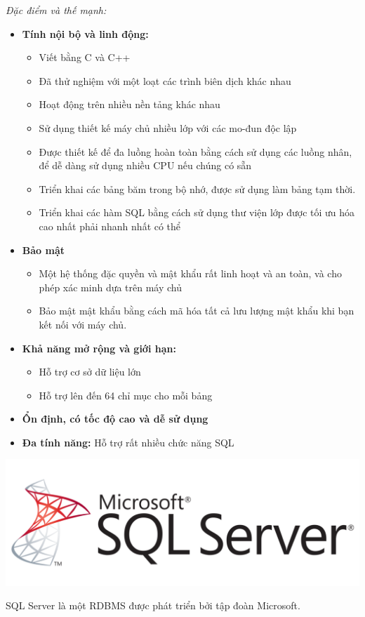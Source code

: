 \textit{Đặc điểm và thế mạnh:}
\begin{itemize}
    \item \textbf{Tính nội bộ và linh động:}
    \begin{itemize}
    \item Viết bằng C và C++
    \item Đã thử nghiệm với một loạt các trình biên dịch khác nhau
    \item Hoạt động trên nhiều nền tảng khác nhau
    \item Sử dụng thiết kế máy chủ nhiều lớp với các mo-đun độc lập
    \item Được thiết kế để đa luồng hoàn toàn bằng cách sử dụng các luồng nhân, để dễ dàng sử dụng nhiều CPU nếu chúng có sẵn
    \item Triển khai các bảng băm trong bộ nhớ, được sử dụng làm bảng tạm thời.
    \item Triển khai các hàm SQL bằng cách sử dụng thư viện lớp được tối ưu hóa cao nhất phải nhanh nhất có thể
    \end{itemize}
    \item \textbf{Bảo mật}
    \begin{itemize}
        \item Một hệ thống đặc quyền và mật khẩu rất linh hoạt và an toàn, và cho phép xác minh dựa trên máy chủ
        \item Bảo mật mật khẩu bằng cách mã hóa tất cả lưu lượng mật khẩu khi bạn kết nối với máy chủ.
    \end{itemize}
    \item \textbf{Khả năng mở rộng và giới hạn:}
    \begin{itemize}
        \item Hỗ trợ cơ sở dữ liệu lớn
        \item Hỗ trợ lên đến 64 chỉ mục cho mỗi bảng
    \end{itemize}
    \item \textbf{Ổn định, có tốc độ cao và dễ sử dụng}
    \item \textbf{Đa tính năng:} Hỗ trợ rất nhiều chức năng SQL
\end{itemize}
\begin{center}
  \captionsetup{type=figure}
    \includegraphics[scale=0.3]{img/sql-server.png}
\end{center}
SQL Server là một RDBMS được phát triển bởi tập đoàn Microsoft.

